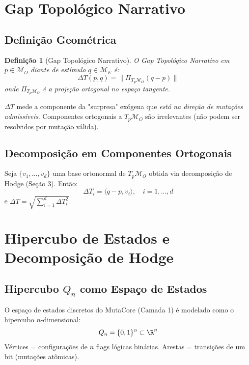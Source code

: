 \documentclass[11pt,a4paper]{article}
\newtheorem{definition}[theorem]{Definição}
\newcommand{\DeltaT}{\Delta T}
\newcommand{\MT}{\mathcal{M}_O}
\newcommand{\ME}{\mathcal{M}_E}
\begin{document}
\section{Gap Topológico Narrativo}

\subsection{Definição Geométrica}

\begin{definition}[Gap Topológico Narrativo]
O Gap Topológico Narrativo em $p \in \MT$ diante de estímulo $q \in \ME$ é:
\begin{equation}
    \DeltaT(p, q) = \| \Pi_{T_p\MT}(q - p) \|
    \label{eq:deltaT_def}
\end{equation}
onde $\Pi_{T_p\MT}$ é a projeção ortogonal no espaço tangente.
\end{definition}

\begin{remark}
$\DeltaT$ mede a componente da "surpresa" exógena que \textit{está na direção de mutações admissíveis}. Componentes ortogonais a $T_p\MT$ são irrelevantes (não podem ser resolvidos por mutação válida).
\end{remark}

\subsection{Decomposição em Componentes Ortogonais}

Seja $\{v_1, \dots, v_d\}$ uma base ortonormal de $T_p\MT$ obtida via decomposição de Hodge (Seção 3). Então:
\begin{equation}
    \DeltaT_i = \langle q - p, v_i \rangle, \quad i = 1, \dots, d
\end{equation}
e $\DeltaT = \sqrt{\sum_{i=1}^d \DeltaT_i^2}$.

\section{Hipercubo de Estados e Decomposição de Hodge}

\subsection{Hipercubo $Q_n$ como Espaço de Estados}

O espaço de estados discretos do MutaCore (Camada 1) é modelado como o hipercubo $n$-dimensional:
\begin{equation}
    Q_n = \{0, 1\}^n \subset \R^n
\end{equation}
Vértices = configurações de $n$ flags lógicas binárias. Arestas = transições de um bit (mutações atômicas).
\end{document}

